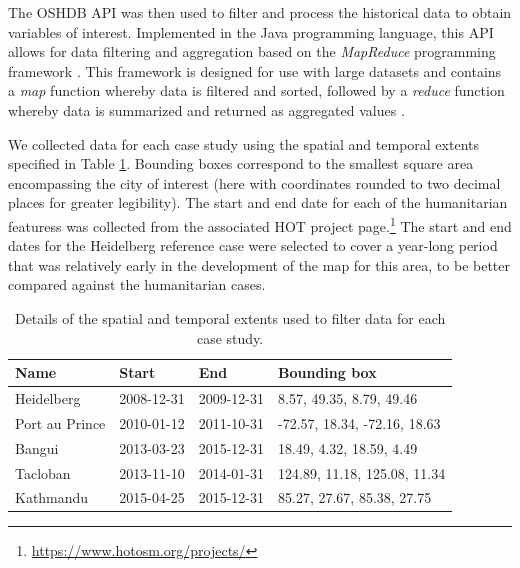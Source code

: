 The OSHDB API \parencite{raifer_oshdb_2019} was then used to filter and process the historical data to obtain variables of interest.  Implemented in the Java programming language, this API allows for data filtering and aggregation based on the \textit{MapReduce} programming framework \parencite{raifer_oshdb_2019}. This framework is designed for use with large datasets and contains a \textit{map} function whereby data is filtered and sorted, followed by a \textit{reduce} function whereby data is summarized and returned as aggregated values \parencite{dean_mapreduce_2008}.

We collected data for each case study using the spatial and temporal extents specified in Table \ref{tab:cases}. Bounding boxes correspond to the smallest square area encompassing the city of interest (here with coordinates rounded to two decimal places for greater legibility). The start and end date for each of the humanitarian featuress was collected from the associated HOT project page.\footnote{\url{https://www.hotosm.org/projects/}} The start and end dates for the Heidelberg reference case were selected to cover a year-long period that was relatively early in the development of the map for this area, to be better compared against the humanitarian cases. 

\begin{table}
\centering
\caption{Details of the spatial and temporal extents used to filter data for each case study.}
\label{tab:cases}
\begin{tabular}{llll}
\toprule
Name                     & Start      & End        & Bounding box                 \\
\midrule
Heidelberg               & 2008-12-31 & 2009-12-31 & 8.57, 49.35, 8.79, 49.46     \\
Port au Prince         & 2010-01-12 & 2011-10-31 & -72.57, 18.34, -72.16, 18.63 \\
Bangui & 2013-03-23 & 2015-12-31 & 18.49, 4.32, 18.59, 4.49     \\
Tacloban           & 2013-11-10 & 2014-01-31 & 124.89, 11.18, 125.08, 11.34 \\
Kathmandu         & 2015-04-25 & 2015-12-31 & 85.27, 27.67, 85.38, 27.75  \\
\bottomrule
\end{tabular}
\end{table}

